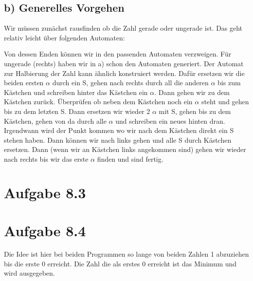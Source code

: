\documentclass{article}
\begin{document}
\subsection*{b) Generelles Vorgehen}
Wir müssen zunächst rausfinden ob die Zahl gerade oder ungerade ist. Das geht relativ leicht über folgenden Automaten:
\begin{center}
\end{center}
Von dessen Enden können wir in den passenden Automaten verzweigen. Für ungerade (rechts) haben wir in a) schon den Automaten generiert. Der Automat zur Halbierung der Zahl kann ähnlich konstruiert werden. Dafür ersetzen wir die beiden ersten $\alpha$ durch ein S, gehen nach rechts durch all die anderen $\alpha$ bis zum Kästchen und schreiben hinter das Kästchen ein $\alpha$. Dann gehen wir zu dem Kästchen zurück. Überprüfen ob neben dem Kästchen noch ein $\alpha$ steht und gehen bis zu dem letzten S. Dann ersetzen wir wieder 2 $\alpha$ mit S, gehen bis zu dem Kästchen, gehen von da durch alle $\alpha$ und schreiben ein neues hinten dran. Irgendwann wird der Punkt kommen wo wir nach dem Kästchen direkt ein S stehen haben. Dann können wir nach links gehen und alle S durch Kästchen ersetzen. Dann (wenn wir an Kästchen links angekommen sind) gehen wir wieder nach rechts bis wir das erste $\alpha$ finden und sind fertig.

\section*{Aufgabe 8.3}
\section*{Aufgabe 8.4}
Die Idee ist hier bei beiden Programmen so lange von beiden Zahlen 1 abzuziehen bis die erste 0 erreicht. Die Zahl die als erstes 0 erreicht ist das Minimum und wird ausgegeben.
\end{document}
